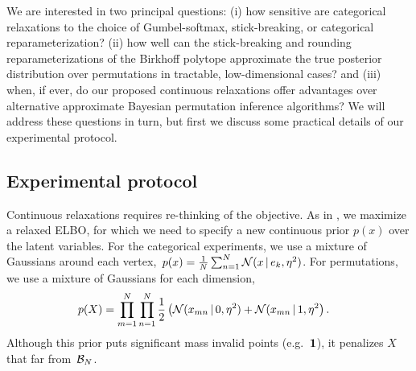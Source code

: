 We are interested in two principal questions: (i) how sensitive
are categorical relaxations to the choice of Gumbel-softmax,
stick-breaking, or categorical reparameterization? (ii) how
well can the stick-breaking and rounding reparameterizations
of the Birkhoff polytope approximate the true posterior distribution
over permutations in tractable, low-dimensional cases? and (iii)
when, if ever, do our proposed continuous relaxations offer
advantages over alternative approximate Bayesian permutation
inference algorithms?  We will address these questions in turn,
but first we discuss some practical details of our experimental
protocol.

\subsection{Experimental protocol}
 Continuous relaxations requires
re-thinking of the objective. As in \cite{maddison2016concrete}, we
maximize a relaxed ELBO, for which we need to specify a new continuous
prior $p(x)$ over the latent variables.
For the categorical experiments, we use a mixture of Gaussians around
each vertex,~${p(x) = \tfrac{1}{N} \sum_{n=1}^N \mathcal{N}(x \, | \, e_k, \eta^2)}$. For permutations, we use a mixture of Gaussians for each
dimension,
\begin{align}
  p(X) &= \prod_{m=1}^N \prod_{n=1}^N
  \frac{1}{2} \left(\mathcal{N}(x_{mn} \, | \, 0, \eta^2) + \mathcal{N}(x_{mn} \, | \, 1, \eta^2 \right).
  \end{align}
Although this prior puts significant mass invalid points
(e.g.~$\boldsymbol{1}$), it penalizes $X$ that far from~$\mathcal{B}_N$.

